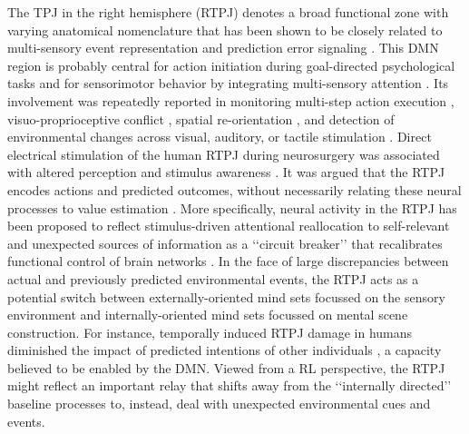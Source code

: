 \documentclass[10pt,letterpaper]{article}
\begin{document}
The TPJ in the right hemisphere (RTPJ) denotes a broad functional zone with
varying anatomical nomenclature \citep{marstpj2011, seghier2010, seghier2013angular}
that has been shown to be closely related to
multi-sensory event representation and prediction error signaling
\citep{downar2000multimodal, vetter2011, shulman2010, shulman2007}.
This DMN region is probably central for
action initiation during goal-directed psychological tasks and for
sensorimotor behavior by integrating multi-sensory attention
\citep{corbetta2002control}.
Its involvement was repeatedly reported in monitoring
multi-step action execution \citep{hartmann2005takes},
visuo-proprioceptive conflict \citep{Balslev2005},
spatial re-orientation \citep{corbetta2000},
and
detection of environmental changes across
visual, auditory, or tactile stimulation
\citep{downar2000multimodal}.
Direct electrical stimulation of the human
RTPJ during neurosurgery was associated with altered perception
and stimulus awareness \citep{blanke2002neuropsychology}.
%
It was argued that the RTPJ encodes actions and predicted outcomes,
without necessarily relating these neural processes to value estimation
\citep{liljeholm2013neural, hamilton2008action,
jakobs2009effects}.
More specifically, neural activity in the RTPJ has been proposed to reflect
stimulus-driven attentional reallocation to
self-relevant and unexpected sources of information
as a ‘‘circuit breaker’’ that recalibrates functional control of brain networks
\citep{bzdok2013tpj, corbettashul2008}.
In the face of large discrepancies between actual and previously predicted
environmental events, the RTPJ acts as a potential switch between
externally-oriented mind sets focussed on the
sensory environment and internally-oriented mind sets focussed
on mental scene construction.
For instance, temporally induced RTPJ damage in humans diminished the
impact of predicted intentions of other individuals
\citep{young2010disruption},
a capacity believed to be enabled by the DMN.
Viewed from a RL perspective,
the RTPJ might reflect an important relay that shifts away
from the ‘‘internally directed’’ baseline processes
to, instead, deal with unexpected environmental cues and events.
\end{document}
